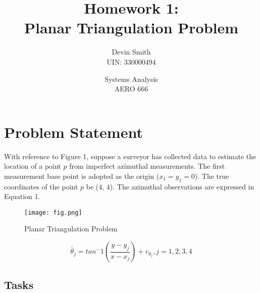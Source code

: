 \documentclass{article}
\title{Homework 1: \\ Planar Triangulation Problem}
\author{Devin Smith \\ UIN: 330000494}
\date{Systems Analysis \\ AERO 666}
\begin{document}
\maketitle

\section{Problem Statement}
With reference to Figure 1, suppose a surveyor has collected data to estimate the location of a point \textbf{$p$} from imperfect azimuthal measurements. The first measurement base point is adopted as the origin ({$x_1 = y_1 = 0$}). The true coordinates of the point \textbf{$p$} be (4, 4). The azimuthal observations are expressed in Equation 1.

\begin{figure}[h]
    \centering
    \texttt{[image: fig.png]}
    \caption{Planar Triangulation Problem}
    \label{fig:enter-label}
\end{figure}

\begin{equation}
    \tilde{\theta_j} = tan^-1(\frac{y - y_j}{x - x_j}) + v_{\theta_j}, j = 1,2,3,4
\end{equation}

\subsection{Tasks}
\end{document}
